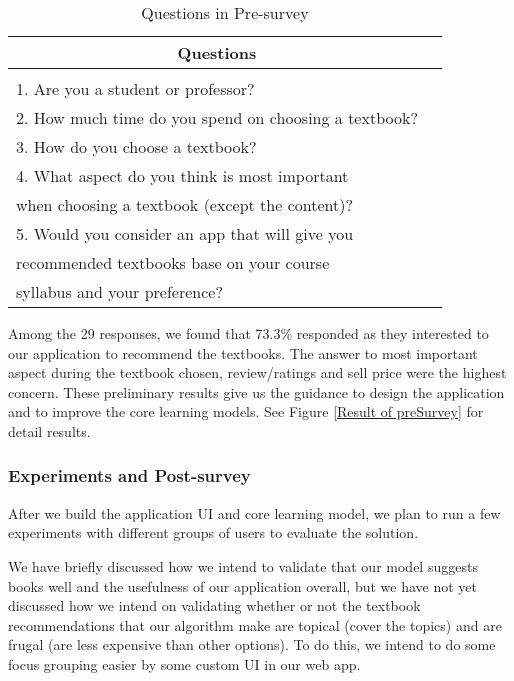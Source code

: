 \begin{table}[ht] 
\caption{Questions in Pre-survey}
\label{Pre-survey}
\begin{center}
\begin{tabular}{ll}
\multicolumn{1}{c}{\bf Questions} 
\\ \hline \\
1. Are you a student or professor?\\
2. How much time do you spend on choosing a textbook?\\
3. How do you choose a textbook?\\
4. What aspect do you think is most important\\
when choosing a textbook (except the content)? \\
5. Would you consider an app that will give you \\
recommended textbooks base on your course \\
syllabus and your preference? \\
\end{tabular}
\end{center}
\end{table}
Among the 29 responses, we found that 73.3\% responded as they interested to our application to recommend the textbooks. The answer to most important aspect during the textbook chosen, review/ratings and sell price were the highest concern. These preliminary results give us the guidance to design the application and to improve the core learning models. See Figure \ref{Result of preSurvey} for detail results.
\subsubsection{Experiments and Post-survey}
After we build the application UI and core learning model, we plan to run a few experiments with different groups of users to evaluate the solution.

We have briefly discussed how we intend to validate that our model suggests books well and the usefulness of our application overall, but we have not yet discussed how we intend on validating whether or not the textbook recommendations that our algorithm make are topical (cover the topics) and are frugal (are less expensive than other options).  
To do this, we intend to do some focus grouping easier by some custom UI in our web app.


